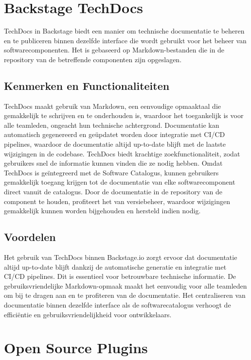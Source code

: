 \section{Backstage TechDocs}

TechDocs in Backstage biedt een manier om technische documentatie te beheren en te publiceren binnen dezelfde interface die wordt gebruikt voor het beheer van softwarecomponenten. Het is gebaseerd op Markdown-bestanden die in de repository van de betreffende componenten zijn opgeslagen.

\subsection{Kenmerken en Functionaliteiten}

TechDocs maakt gebruik van Markdown, een eenvoudige opmaaktaal die gemakkelijk te schrijven en te onderhouden is, waardoor het toegankelijk is voor alle teamleden, ongeacht hun technische achtergrond. Documentatie kan automatisch gegenereerd en geüpdatet worden door integratie met CI/CD pipelines, waardoor de documentatie altijd up-to-date blijft met de laatste wijzigingen in de codebase. TechDocs biedt krachtige zoekfunctionaliteit, zodat gebruikers snel de informatie kunnen vinden die ze nodig hebben. Omdat TechDocs is geïntegreerd met de Software Catalogus, kunnen gebruikers gemakkelijk toegang krijgen tot de documentatie van elke softwarecomponent direct vanuit de catalogus. Door de documentatie in de repository van de component te houden, profiteert het van versiebeheer, waardoor wijzigingen gemakkelijk kunnen worden bijgehouden en hersteld indien nodig.

\subsection{Voordelen}

Het gebruik van TechDocs binnen Backstage.io zorgt ervoor dat documentatie altijd up-to-date blijft dankzij de automatische generatie en integratie met CI/CD pipelines. Dit is essentieel voor betrouwbare technische informatie. De gebruiksvriendelijke Markdown-opmaak maakt het eenvoudig voor alle teamleden om bij te dragen aan en te profiteren van de documentatie. Het centraliseren van documentatie binnen dezelfde interface als de softwarecatalogus verhoogt de efficiëntie en gebruiksvriendelijkheid voor ontwikkelaars.

\section{Open Source Plugins}

